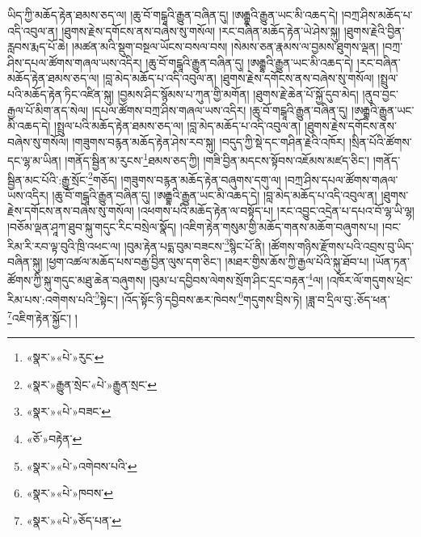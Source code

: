 ཡིད་ཀྱི་མཆོད་རྟེན་ཐམས་ཅད་ལ། །ཆུ་བོ་གངྒཱའི་རྒྱུན་བཞིན་དུ། །ཨརྒྷའི་རྒྱུན་ཡང་མི་འཆད་དེ། །བཀྲ་ཤིས་མཆོད་པ་འདི་འབུལ་ན། །ཐུགས་རྗེས་དགོངས་ནས་བཞེས་སུ་གསོལ། །རང་བཞིན་མཆོད་རྟེན་ཡེ་ཤེས་སྐུ། །ཐུགས་རྗེའི་བྱིན་རླབས་རྨད་པོ་ཆེ། །མཚན་མའི་སྡུག་བསྔལ་ཡོངས་བསལ་བས། །སེམས་ཅན་རྣམས་ལ་བྱམས་ཐུགས་ལྡན། །བཀྲ་ཤིས་དཔལ་ཚོགས་གཞལ་ཡས་འདིར། །ཆུ་བོ་གངྒཱའི་རྒྱུན་བཞིན་དུ། །ཨརྒྷའི་རྒྱུན་ཡང་མི་འཆད་དེ། །རང་བཞིན་མཆོད་རྟེན་ཐམས་ཅད་ལ། །བླ་མེད་མཆོད་པ་འདི་འབུལ་ན། །ཐུགས་རྗེས་དགོངས་ནས་བཞེས་སུ་གསོལ། །སྤྲུལ་པའི་མཆོད་རྟེན་ཏིང་འཛིན་སྐུ། །བྱམས་ཤིང་སྙོམས་པ་ཀུན་གྱི་མགོན། །ཐུགས་རྗེ་ཆེན་པོ་སྐྱོ་དུབ་མེད། །ནུབ་བྱང་རྒྱལ་པོ་མིག་ནད་སེལ། །དཔལ་ཚོགས་བཀྲ་ཤིས་གཞལ་ཡས་འདིར། །ཆུ་བོ་གངྒཱའི་རྒྱུན་བཞིན་དུ། །ཨརྒྷའི་རྒྱུན་ཡང་མི་འཆད་དེ། །སྤྲུལ་པའི་མཆོད་རྟེན་ཐམས་ཅད་ལ། །བླ་མེད་མཆོད་པ་འདི་འབུལ་ན། །ཐུགས་རྗེས་དགོངས་ནས་བཞེས་སུ་གསོལ། །གཟུགས་བརྙན་མཆོད་རྟེན་ཤེས་རབ་སྐུ། །བདུད་ཀྱི་སྡེ་དང་གཤིན་རྗེའི་འཁོར། །སྲིན་པོའི་ཚོགས་དང་ལྷ་མ་ཡིན། །གནོད་སྦྱིན་མ་རུངས་\footnote{«སྣར་»«པེ་»རུང་}ཐམས་ཅད་ཀྱི། །གཟི་བྱིན་མདངས་སྟོབས་འཇོམས་མཛད་ཅིང་། །གནོད་སྦྱིན་མང་པོའི་:རྒྱུ་སྲོང་\footnote{«སྣར་»རྒྱུན་སྲེང་«པེ་»རྒྱུན་སྲང་}གཅོད། །གཟུགས་བརྙན་མཆོད་རྟེན་བཞུགས་དགུ་ལ། །བཀྲ་ཤིས་དཔལ་ཚོགས་གཞལ་ཡས་འདིར། །ཆུ་བོ་གངྒཱའི་རྒྱུན་བཞིན་དུ། །ཨརྒྷའི་རྒྱུན་ཡང་མི་འཆད་དེ། །བླ་མེད་མཆོད་པ་འདི་འབུལ་ན། །ཐུགས་རྗེས་དགོངས་ནས་བཞེས་སུ་གསོལ། །འཕགས་པའི་མཆོད་རྟེན་ལ་བསྟོད་པ། །རང་འབྱུང་འདྲེན་པ་དཔའ་བོ་ལྷ་ཡི་ལྷ། །བཅོམ་ལྡན་ཤཱཀ་ཐུབ་སྐུ་གདུང་རིང་བསྲེལ་སྣོད། །འཇིག་རྟེན་གསུམ་གྱི་མཆོད་གནས་མཆོག་བཞུགས་པ། །བང་རིམ་རི་རབ་ལྟ་བུའི་ཁྲི་འཕང་ལ། །བུམ་རྟེན་པདྨ་བུམ་བཟངས་\footnote{«སྣར་»«པེ་»བཟང་}སྙིང་པོ་ནི། །ཚོགས་གཉིས་རྫོགས་པའི་འབྲས་བུ་ཡིད་བཞིན་སྐུ། །ཕྱག་འཚལ་མཆོད་པས་བརྒྱ་བྱིན་ལུས་དག་ཅིང་། །མཐར་གྱིས་ཆོས་ཀྱི་རྒྱལ་པོའི་སྐུ་ཐོབ་པ། །ཡོན་ཏན་ཚོགས་ཀྱི་སྐུ་གདུང་མཐུ་ཆེན་བཞུགས། །བུམ་པ་དབྱིབས་ལེགས་སྲོག་ཤིང་དྲང་བརྟན་\footnote{«ཅོ་»བརྟེན་}ལ། །འཁོར་ལོ་གདུགས་ཕྲེང་རིམ་པས་:འགེགས་པའི་\footnote{«སྣར་»«པེ་»འགེབས་པའི་}སྟེང་། །འོད་སྟོང་ཉི་དབྱིབས་ཆར་ཁེབས་\footnote{«སྣར་»«པེ་»ཁབས་}གདུགས་བྲིས་ཏེ། །ཟླ་བ་དྲིལ་བུ་:ཅོད་ཕན་\footnote{«སྣར་»«པེ་»ཅོད་པན་}འཇིག་རྟེན་སྐྱོང་། །
